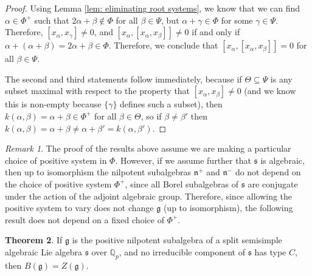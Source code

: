 \documentclass[12pt,a4paper]{article}
\theoremstyle{definition}
\newtheorem{thm}{Theorem}[section]
\theoremstyle{remark}
\newtheorem{rk}[thm]{Remark}
\theoremstyle{custthm}
\begin{document}
\begin{proof}

Using Lemma \ref{lem: eliminating root systems}, we know that we can find $\alpha\in\Phi^+$ such that $2\alpha+\beta\notin\Phi$ for all $\beta\in\Psi$, but $\alpha+\gamma\in\Phi$ for some $\gamma\in\Psi$. Therefore, $[x_\alpha,x_\gamma]\neq 0$, and $[x_\alpha,[x_\alpha,x_\beta]]\neq 0$ if and only if $\alpha+(\alpha+\beta)=2\alpha+\beta\in\Phi$. Therefore, we conclude that $[x_\alpha,[x_\alpha,x_\beta]]=0$ for all $\beta\in\Psi$.

The second and third statements follow immediately, because if $\Theta\subseteq\Psi$ is any subset maximal with respect to the property that $[x_\alpha,x_\beta]\neq 0$ (and we know this is non-empty because $\{\gamma\}$ defines such a subset), then $k(\alpha,\beta)=\alpha+\beta\in\Phi^+$ for all $\beta\in\Theta$, so if $\beta\neq\beta'$ then $k(\alpha,\beta)=\alpha+\beta\neq\alpha+\beta'=k(\alpha,\beta')$.\end{proof}

\begin{rk}
The proof of the results above assume we are making a particular choice of positive system in $\Phi$. However, if we assume further that $\mathfrak{s}$ is algebraic, then up to isomorphism the nilpotent subalgebras $\mathfrak{n}^+$ and $\mathfrak{n}^-$ do not depend on the choice of positive system $\Phi^+$, since all Borel subalgebras of $\mathfrak{s}$ are conjugate under the action of the adjoint algebraic group. Therefore, since allowing the positive system to vary does not change $\mathfrak{g}$ (up to isomorphism), the following result does not depend on a fixed choice of $\Phi^+$.
\end{rk}

\begin{thm}\label{thm: B(g) for g nilpotent subalgebra}
If $\mathfrak{g}$ is the positive nilpotent subalgebra of a split semisimple algebraic Lie algebra $\mathfrak{s}$ over $\mathbb{Q}_p$, and no irreducible component of $\mathfrak{s}$ has type $C$, then $B(\mathfrak{g})=Z(\mathfrak{g})$.
\end{thm}
\end{document}
